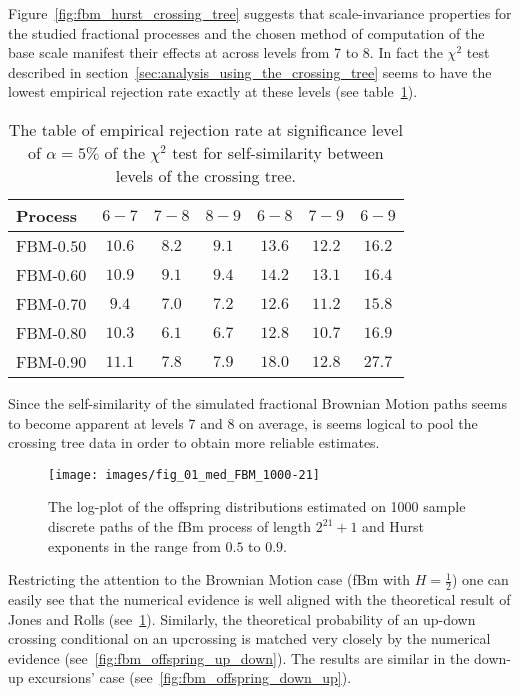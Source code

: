 Figure~\ref{fig:fbm_hurst_crossing_tree} suggests that scale-invariance properties
for the studied fractional processes and the chosen method of computation of the base
scale manifest their effects at across levels from 7 to 8. In fact the $\chi^2$ test
described in section~\ref{sec:analysis_using_the_crossing_tree} seems to have the lowest
empirical rejection rate exactly at these levels (see table~\ref{tbl:chi_sq_test_for_fbm_only}).
\begin{table}[h]\begin{center}
	\begin{tabular}{l||c|c|c|c|c|c|}
	Process 		&  $6-7$ & $7-8$ & $8-9$ &  $6-8$ &  $7-9$ &  $6-9$ \\ \hline\hline
	FBM-$0.50$ 		& $10.6$ & $\mathbf{8.2}$ & $9.1$ & $13.6$ & $12.2$ & $16.2$ \\ \hline 
	FBM-$0.60$ 		& $10.9$ & $\mathbf{9.1}$ & $9.4$ & $14.2$ & $13.1$ & $16.4$ \\ \hline 
	FBM-$0.70$ 		&  $9.4$ & $\mathbf{7.0}$ & $7.2$ & $12.6$ & $11.2$ & $15.8$ \\ \hline 
	FBM-$0.80$ 		& $10.3$ & $\mathbf{6.1}$ & $6.7$ & $12.8$ & $10.7$ & $16.9$ \\ \hline 
	FBM-$0.90$ 		& $11.1$ & $\mathbf{7.8}$ & $7.9$ & $18.0$ & $12.8$ & $27.7$ \\ \hline 
 	\end{tabular}
	\caption{The table of empirical rejection rate at significance level of $\alpha = 5\%$
	of the $\chi^2$ test for self-similarity between levels of the crossing tree. }
\label{tbl:chi_sq_test_for_fbm_only}
\end{center}\end{table}
Since the self-similarity of the simulated fractional Brownian Motion paths seems
to become apparent at levels 7 and 8 on average, is seems logical to pool the crossing
tree data in order to obtain more reliable estimates.

\begin{figure}[htb]\begin{center}
    \texttt{[image: images/fig\_01\_med\_FBM\_1000-21]}
    \caption{The log-plot of the offspring distributions estimated on 1000 sample discrete paths
    of the fBm process of length $2^{21}+1$ and Hurst exponents in the range from $0.5$ to $0.9$.}
\label{fig:fbm_offspring_distribution}
\end{center}\end{figure}

Restricting the attention to the Brownian Motion case (fBm with $H=\tfrac{1}{2}$)
one can easily see that the numerical evidence is well aligned with the theoretical
result of Jones and Rolls (see~\ref{fig:fbm_offspring_distribution}). Similarly, the
theoretical probability of an up-down crossing conditional on an upcrossing is matched
very closely by the numerical evidence (see~\ref{fig:fbm_offspring_up_down}). The
results are similar in the down-up excursions' case (see~\ref{fig:fbm_offspring_down_up}).


